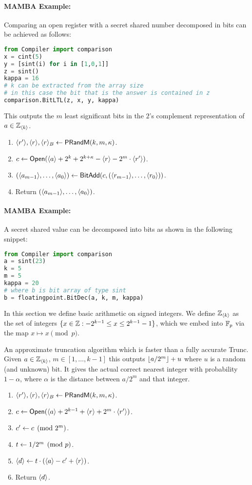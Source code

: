 \paragraph{MAMBA Example:} Comparing an open register with a secret shared number decomposed in bits can be achieved as follows: 
\begin{lstlisting}[language={python}]
from Compiler import comparison
x = cint(5)
y = [sint(i) for i in [1,0,1]]
z = sint()
kappa = 16
# k can be extracted from the array size
# in this case the bit that is the answer is contained in z
comparison.BitLTL(z, x, y, kappa)
\end{lstlisting}

This outputs the $m$ least significant bits in the $2$'s complement
representation of $a \in {\mathbb{Z}}_{\langle k \rangle}$.
\begin{enumerate}
\item $\langle r' \rangle, \langle r \rangle, \langle r \rangle_B \leftarrow \mathsf{PRandM}(k,m,\kappa)$.
\item $c \leftarrow {\mathsf{Open}}(\langle a \rangle+2^k+2^{k+\kappa}-\langle r \rangle-2^m \cdot \langle r' \rangle)$.
\item $(\langle a_{m-1} \rangle,\ldots,\langle a_0 \rangle) \leftarrow 
	\mathsf{BitAdd}(c,(\langle r_{m-1} \rangle,\ldots,\langle r_0 \rangle))$.
\item Return $(\langle a_{m-1} \rangle,\ldots,\langle a_0 \rangle)$.
\end{enumerate}
\paragraph{MAMBA Example:} A secret shared value can be decomposed into bits as shown in the following snippet: 
\begin{lstlisting}[language={python}]
from Compiler import comparison
a = sint(23)
k = 5
m = 5
kappa = 20
# where b is bit array of type sint
b = floatingpoint.BitDec(a, k, m, kappa)
\end{lstlisting}

In this section we define basic arithmetic on signed integers.
We define ${\mathbb{Z}}_{\langle k \rangle}$ as the set of integers $\{x \in {\mathbb{Z}}: -2^{k-1} \le x \le 2^{k-1}-1\}$,
which we embed into ${\mathbb{F}}_p$ via the map $x \mapsto x \pmod{p}$.

An approximate truncation algorithm which is faster than 
a fully accurate Trunc. 
Given $a \in {\mathbb{Z}}_{\langle k \rangle}$, $m \in [1,\ldots,k-1]$
this outputs ${\lfloor a/2^m \rfloor}+u$ where $u$ is a random
(and unknown) bit.
It gives the actual correct nearest integer with
probability $1-\alpha$, where $\alpha$ is the distance
between $a/2^m$ and that integer.
\begin{enumerate}
\item $\langle r' \rangle, \langle r \rangle, \langle r \rangle_B \leftarrow \mathsf{PRandM}(k,m,\kappa)$.
\item $c \leftarrow {\mathsf{Open}}(\langle a \rangle+2^{k-1}+\langle r \rangle+2^m \cdot \langle r' \rangle)$.
\item $c'\leftarrow c \pmod{2^m}$.
\item $t \leftarrow 1/2^m \pmod{p}$.
\item $\langle d \rangle \leftarrow t \cdot (\langle a \rangle-c'+\langle r \rangle)$.
\item Return $\langle d \rangle$.
\end{enumerate}
